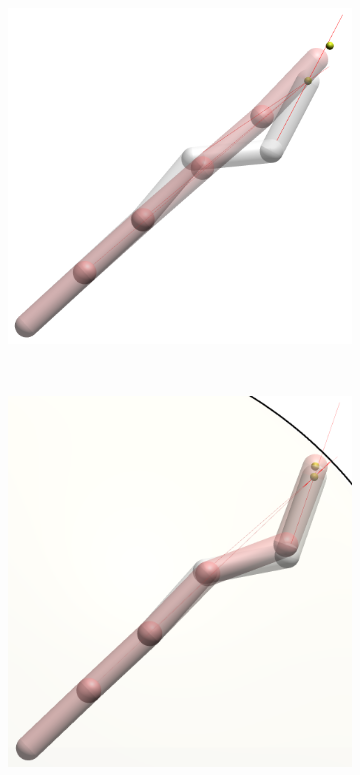 \begin{figure}[h]
    \centering
    \begin{subfigure}[b]{.3\textwidth}
        \includegraphics[width=\textwidth]{Figures/arm-full-nosphere.png}
    \end{subfigure}
    ~
    \begin{subfigure}[b]{.3\textwidth}
        \includegraphics[width=\textwidth]{Figures/arm-full-sphere.png}
    \end{subfigure}


\end{figure}
